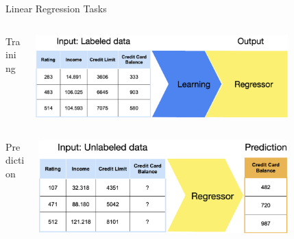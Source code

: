 \documentclass[11pt,compress,t,notes=noshow, xcolor=table]{beamer}
\begin{document}
\begin{vbframe}{Linear Regression Tasks}
\begin{columns}  
\begin{column}{0.1\textwidth} 
\begin{center}
Training
\end{center}
\end{column}
\begin{column}{0.9\textwidth} 
\begin{center}
  \includegraphics[width = 0.8\textwidth]{slides/supervised-regression/figure_man/nutshell-regression-learning-task.png}
\end{center}
\end{column}
\end{columns}
\begin{columns}
\begin{column}{0.1\textwidth} 
\begin{center}
Prediction
\end{center}
\end{column}
\begin{column}{0.9\textwidth} 
\begin{center}
  \includegraphics[width = 0.8\textwidth]{slides/supervised-regression/figure_man/nutshell-regression-prediction-task.png} 
\end{center}
\end{column}
\end{columns}

\end{vbframe}
\end{document}
